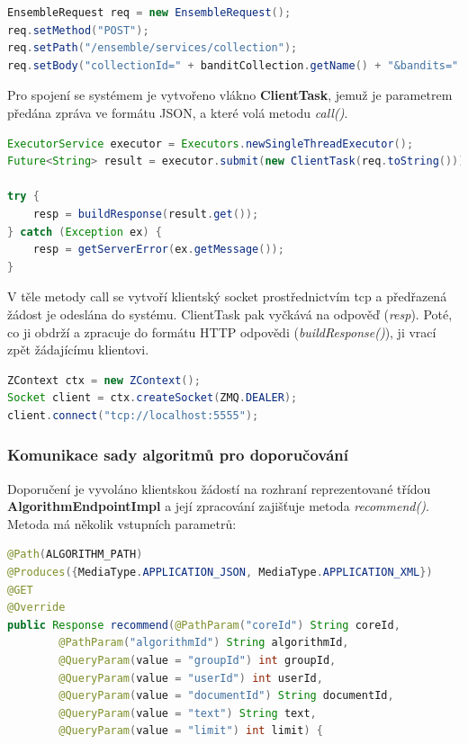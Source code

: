 \documentclass[thesis=M,czech]{FITthesis}[2014/05/07]
\begin{document}
\begin{lstlisting}[language=java]
EnsembleRequest req = new EnsembleRequest();
req.setMethod("POST");
req.setPath("/ensemble/services/collection");
req.setBody("collectionId=" + banditCollection.getName() + "&bandits=" + formatBanditIds(banditCollection.getBanditIds()));
\end{lstlisting}

Pro spojení se systémem je vytvořeno vlákno \textbf{ClientTask}, jemuž je parametrem předána zpráva ve formátu JSON, a které volá metodu \emph{call()}.

\begin{lstlisting}[language=java]
ExecutorService executor = Executors.newSingleThreadExecutor();
Future<String> result = executor.submit(new ClientTask(req.toString()));

try {
    resp = buildResponse(result.get());
} catch (Exception ex) {
    resp = getServerError(ex.getMessage());
}
\end{lstlisting}

V těle metody call se vytvoří klientský socket prostřednictvím tcp a předřazená žádost je odeslána do systému. ClientTask pak vyčkává na odpověď (\emph{resp}). Poté, co ji obdrží a zpracuje do formátu HTTP odpovědi (\emph{buildResponse()}), ji vrací zpět žádajícímu klientovi. 

\begin{lstlisting}[language=java]
ZContext ctx = new ZContext();
Socket client = ctx.createSocket(ZMQ.DEALER);
client.connect("tcp://localhost:5555");
\end{lstlisting}

\subsubsection{Komunikace sady algoritmů pro doporučování}
\label{sec:algcom}
Doporučení je vyvoláno klientskou žádostí na rozhraní reprezentované třídou \textbf{AlgorithmEndpointImpl} a její zpracování zajišťuje metoda \emph{recommend()}. Metoda má několik vstupních parametrů:

\begin{lstlisting}[language=java]
@Path(ALGORITHM_PATH)
@Produces({MediaType.APPLICATION_JSON, MediaType.APPLICATION_XML})
@GET
@Override
public Response recommend(@PathParam("coreId") String coreId,
        @PathParam("algorithmId") String algorithmId,
        @QueryParam(value = "groupId") int groupId,
        @QueryParam(value = "userId") int userId,
        @QueryParam(value = "documentId") String documentId,
        @QueryParam(value = "text") String text,
        @QueryParam(value = "limit") int limit) {
\end{lstlisting}
\end{document}
